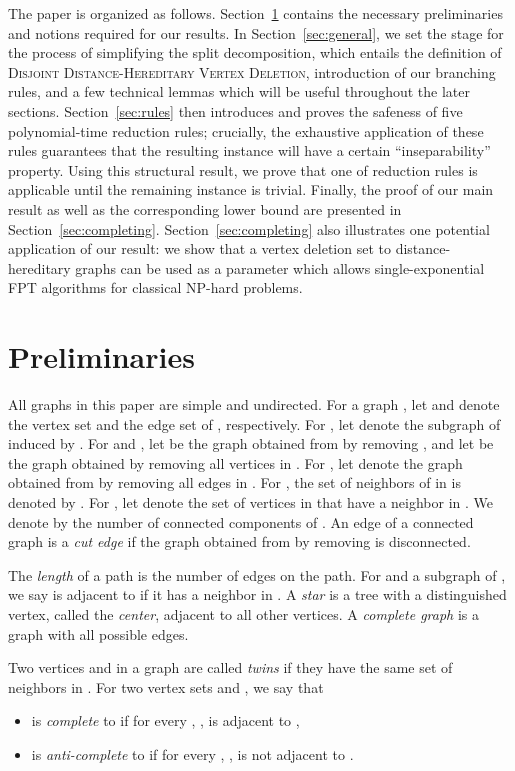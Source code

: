 \documentclass[11pt]{elsarticle}
\begin{document}
The paper is organized as follows. Section~\ref{sec:prelim} contains the necessary preliminaries and notions required for our results. In Section~\ref{sec:general}, we set the stage for the process of simplifying the split decomposition, which entails the definition of \textsc{Disjoint Distance-Hereditary Vertex Deletion}, introduction of our branching rules, and a few technical lemmas which will be useful throughout the later sections.
Section~\ref{sec:rules} then introduces and proves the safeness of five polynomial-time reduction rules; crucially, the exhaustive application of these rules guarantees that the resulting instance will have a certain ``inseparability'' property. Using this structural result, we prove that one of reduction rules is applicable until the remaining instance is trivial. Finally, the proof of our main result as well as the corresponding lower bound are presented in Section~\ref{sec:completing}. Section~\ref{sec:completing} also illustrates one potential application of our result: we show that a vertex deletion set to distance-hereditary graphs can be used as a parameter which allows single-exponential FPT algorithms for classical NP-hard problems.

\section{Preliminaries}\label{sec:prelim}

All graphs in this paper are simple and undirected.
For a graph , let  and  denote the vertex set and the edge set of , respectively. 
For , let  denote the subgraph of  induced by . For  and , let  be the graph obtained from  by removing , and let  be the graph obtained by removing all vertices in . 
For , let  denote the graph obtained from  by removing all edges in .
For , the set of neighbors of  in  is denoted by .
For , let  denote the set of vertices in  that have a neighbor in .
We denote by  the number of connected components of .
An edge  of a connected graph  is a \emph{cut edge} if the graph obtained from  by removing  is disconnected.

The \emph{length} of a path is the number of edges on the path.
For  and a subgraph  of , we say  is adjacent to  if it has a neighbor in .
A \emph{star} is a tree with a distinguished vertex, called the \emph{center}, adjacent to all other vertices. A \emph{complete graph} is a graph with all possible edges.

Two vertices  and  in a graph  are called \emph{twins} if they have the same set of neighbors in . 
For two vertex sets  and , we say that 
\begin{itemize}
\item  is \emph{complete} to  if for every , ,  is adjacent to , 
\item  is \emph{anti-complete} to  if for every , ,  is not adjacent to .
\end{itemize}
\end{document}
